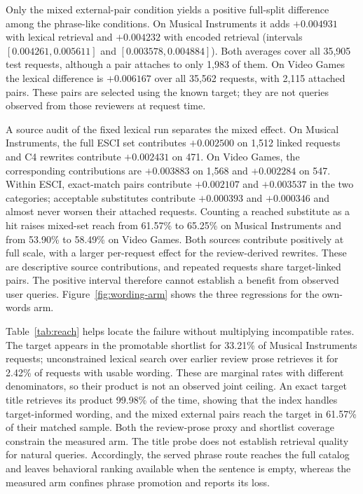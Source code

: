 \documentclass[11pt]{article}
\begin{document}
Only the mixed external-pair condition yields a positive full-split difference among the phrase-like conditions. On Musical Instruments it adds $+0.004931$ with lexical retrieval and $+0.004232$ with encoded retrieval (intervals $[0.004261, 0.005611]$ and $[0.003578, 0.004884]$). Both averages cover all 35,905 test requests, although a pair attaches to only 1,983 of them. On Video Games the lexical difference is $+0.006167$ over all 35,562 requests, with 2,115 attached pairs. These pairs are selected using the known target; they are not queries observed from those reviewers at request time.

A source audit of the fixed lexical run separates the mixed effect. On Musical Instruments, the full ESCI set contributes $+0.002500$ on 1,512 linked requests and C4 rewrites contribute $+0.002431$ on 471. On Video Games, the corresponding contributions are $+0.003883$ on 1,568 and $+0.002284$ on 547. Within ESCI, exact-match pairs contribute $+0.002107$ and $+0.003537$ in the two categories; acceptable substitutes contribute $+0.000393$ and $+0.000346$ and almost never worsen their attached requests. Counting a reached substitute as a hit raises mixed-set reach from 61.57\% to 65.25\% on Musical Instruments and from 53.90\% to 58.49\% on Video Games. Both sources contribute positively at full scale, with a larger per-request effect for the review-derived rewrites. These are descriptive source contributions, and repeated requests share target-linked pairs. The positive interval therefore cannot establish a benefit from observed user queries. Figure~\ref{fig:wording-arm} shows the three regressions for the own-words arm.

Table~\ref{tab:reach} helps locate the failure without multiplying incompatible rates. The target appears in the promotable shortlist for 33.21\% of Musical Instruments requests; unconstrained lexical search over earlier review prose retrieves it for 2.42\% of requests with usable wording. These are marginal rates with different denominators, so their product is not an observed joint ceiling. An exact target title retrieves its product 99.98\% of the time, showing that the index handles target-informed wording, and the mixed external pairs reach the target in 61.57\% of their matched sample. Both the review-prose proxy and shortlist coverage constrain the measured arm. The title probe does not establish retrieval quality for natural queries. Accordingly, the served phrase route reaches the full catalog and leaves behavioral ranking available when the sentence is empty, whereas the measured arm confines phrase promotion and reports its loss.
\end{document}
